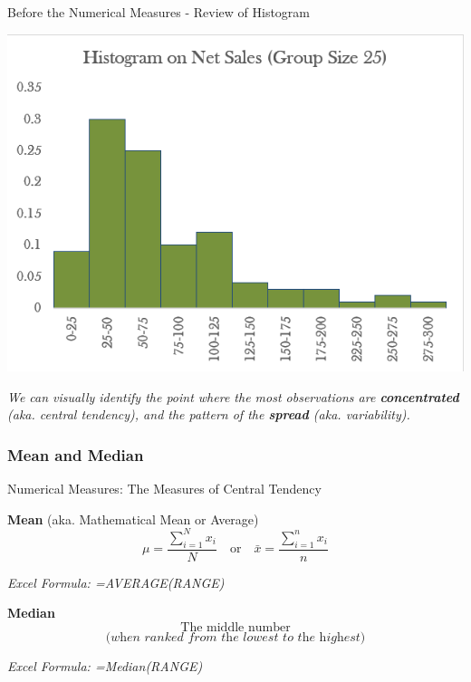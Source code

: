 \documentclass{beamer}
\begin{document}
\begin{frame}{Before the Numerical Measures - Review of Histogram}

\begin{center}

\includegraphics[scale=0.5]{images/ch2Histogram.png}
\end{center}

\begin{center}
\textit{We can visually identify the point where the most observations are \textbf{concentrated} (aka. central tendency), and the pattern of the \textbf{spread} (aka. variability).  
}
\end{center}

\end{frame}


\subsubsection{Mean and Median}
\begin{frame}{Numerical Measures: The Measures of Central Tendency}

\textbf{Mean} (aka. Mathematical Mean or Average)
$$\mu = \frac{\sum_{i=1}^{N}x_i}{N} \quad\text{or}\quad \bar{x} = \frac{\sum_{i=1}^{n}x_i}{n}$$

\begin{flushright}

\textit{Excel Formula: 
=AVERAGE(RANGE)
}
\end{flushright}



\textbf{Median}
$$ \text{The middle number} $$
$$ \textit{(when ranked from the lowest to the highest)} $$


\begin{flushright}

\textit{Excel Formula: 
=Median(RANGE)}

\end{flushright}



\end{frame}
\end{document}
